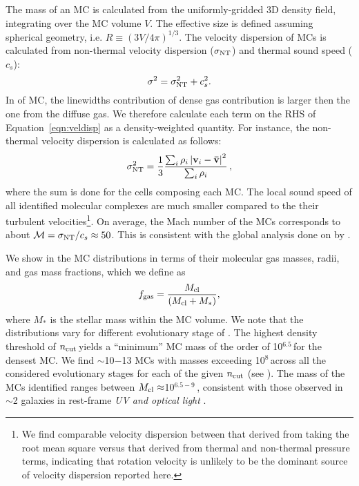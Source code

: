 \IfFileExists{emulateapjlegacy.cls}{\documentclass[iop]{emulateapjlegacy}}{\documentclass[iop]{emulateapj}}
\begin{document}
The mass of an MC is calculated from the uniformly-gridded 3D density field, integrating over the MC volume $V$. The effective size is defined assuming spherical geometry, i.e. $R \equiv (3 V /4 \pi)^{1/3}$.
%
The velocity dispersion of MCs is calculated from non-thermal velocity dispersion ($\sigma_{\rm NT}$) and thermal sound speed ($c_s$):
\begin{equation}
\sigma^2 = \sigma_{\rm NT}^2 + c_s^2.
\label{eqn:veldisp}
\end{equation}
% 
In \obs of MC, the linewidths contribution of dense gas contribution is larger then the one from the diffuse gas. We therefore calculate 
each term on the RHS of Equation~\ref{eqn:veldisp} as a density-weighted quantity. For instance, the non-thermal velocity dispersion is 
calculated as follows:
\begin{equation}
\sigma_{\rm NT}^2 = \frac{1}{{3}}\frac{\sum_{i} \rho_i \left|\mathbf{v}_i - \mathbf{\bar v}\right|^2}{\sum_i \rho_i}\,,
\end{equation}
where the sum is done for the cells composing each MC.
The local sound speed of all identified molecular complexes are much smaller compared to the their turbulent velocities\footnote{We find comparable velocity dispersion between that derived from taking the root mean square versus that derived from thermal and non-thermal pressure terms, indicating that rotation velocity is unlikely to be the dominant source of velocity dispersion reported here.}. On average, the Mach number of the MCs corresponds to about $\mathcal{M} = \sigma_{\rm NT}/c_s\approx 50$. This is consistent with the global analysis done on \flower by \citet{Vallini18a}.

We show in  the MC distributions in terms of their molecular gas masses, radii, and gas mass fractions, which we define as
\begin{equation}
f_{\rm gas} = \frac{M_{\rm cl}} {\left(M_{\rm cl} + M_*\right)},
\end{equation}
where $M_*$ is the stellar mass within the MC volume.
%
We note that the distributions vary for different evolutionary stage of \flower. The highest density threshold of $n_{\rm cut}$\,\cc yields a ``minimum'' MC mass of the order of 10$^{6.5}$\,\Msun for the densest MC.
%
We find $\sim$10$-$13 MCs with masses exceeding 10$^8$\,\Msun across all the considered evolutionary stages for each of the given $n_{\rm cut}$ (see ). The mass of the MCs identified ranges between $M_{\rm cl}\approx$10$^{6.5-9}$\,\Msun, consistent with those observed in \z$\sim$2 galaxies in rest-frame {\it UV and optical light} \citep{Elmegreen07a, Elmegreen09a}.
\end{document}
